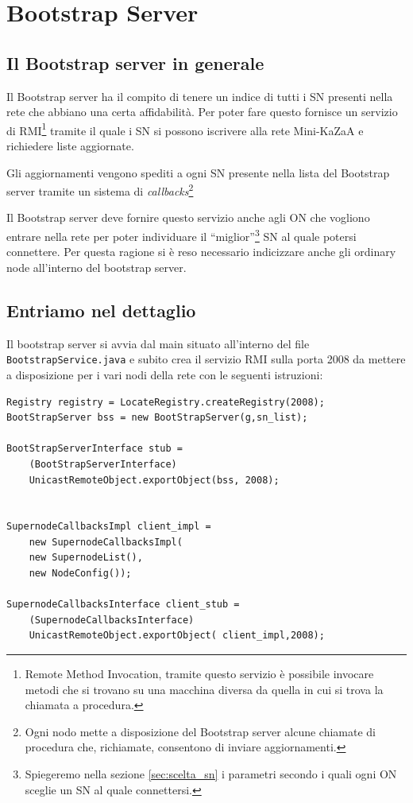 \chapter{Bootstrap Server}

\section{Il Bootstrap server in generale}
Il Bootstrap server ha il compito di tenere un indice di tutti i SN presenti nella rete che abbiano
una certa affidabilità. 
Per poter fare questo fornisce un servizio di RMI\footnote{Remote Method Invocation, tramite questo servizio è possibile invocare metodi che si trovano su una macchina diversa da quella in cui si trova la chiamata a procedura.} tramite il quale i SN si possono iscrivere alla rete Mini-KaZaA e richiedere liste aggiornate.

Gli aggiornamenti vengono spediti a ogni SN presente nella lista del Bootstrap server tramite un sistema di \emph{callbacks}\footnote{Ogni nodo mette a disposizione del Bootstrap server alcune chiamate di procedura che, richiamate, consentono di inviare aggiornamenti.}

Il Bootstrap server deve fornire questo servizio anche agli ON che vogliono entrare nella rete per poter individuare il ``miglior''\footnote{Spiegeremo nella sezione \ref{sec:scelta_sn} i parametri secondo i quali ogni ON sceglie un SN al quale connettersi.} SN al quale potersi connettere.
Per questa ragione si è reso necessario indicizzare anche gli ordinary node all'interno del bootstrap server.

\section{Entriamo nel dettaglio}
Il bootstrap server si avvia dal main situato all'interno del file \verb|BootstrapService.java| e subito crea il servizio RMI sulla porta 2008 da mettere a disposizione per i vari nodi della rete con le seguenti istruzioni:
\newline
\begin{lstlisting}
Registry registry = LocateRegistry.createRegistry(2008);
BootStrapServer bss = new BootStrapServer(g,sn_list);

BootStrapServerInterface stub = 
	(BootStrapServerInterface) 
	UnicastRemoteObject.exportObject(bss, 2008);


SupernodeCallbacksImpl client_impl = 
	new SupernodeCallbacksImpl(
	new SupernodeList(), 
	new NodeConfig());
            
SupernodeCallbacksInterface client_stub = 
	(SupernodeCallbacksInterface) 
	UnicastRemoteObject.exportObject( client_impl,2008);
\end{lstlisting}

